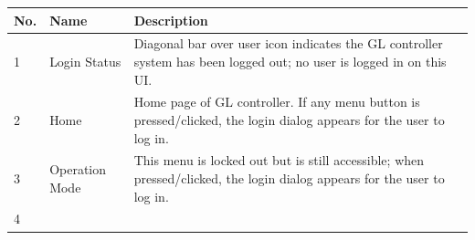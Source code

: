 \begin{longtable}[]{@{}lll@{}}
\toprule
\begin{minipage}[b]{0.10\columnwidth}\raggedright
No.\strut
\end{minipage} & \begin{minipage}[b]{0.14\columnwidth}\raggedright
Name\strut
\end{minipage} & \begin{minipage}[b]{0.67\columnwidth}\raggedright
Description\strut
\end{minipage}\tabularnewline
\midrule
\endhead
\begin{minipage}[t]{0.10\columnwidth}\raggedright
1\strut
\end{minipage} & \begin{minipage}[t]{0.14\columnwidth}\raggedright
Login Status\strut
\end{minipage} & \begin{minipage}[t]{0.67\columnwidth}\raggedright
Diagonal bar over user icon indicates the GL controller system has been
logged out; no user is logged in on this UI.\strut
\end{minipage}\tabularnewline
\begin{minipage}[t]{0.10\columnwidth}\raggedright
2\strut
\end{minipage} & \begin{minipage}[t]{0.14\columnwidth}\raggedright
Home\strut
\end{minipage} & \begin{minipage}[t]{0.67\columnwidth}\raggedright
Home page of GL controller. If any menu button is pressed/clicked, the
login dialog appears for the user to log in.\strut
\end{minipage}\tabularnewline
\begin{minipage}[t]{0.10\columnwidth}\raggedright
3\strut
\end{minipage} & \begin{minipage}[t]{0.14\columnwidth}\raggedright
Operation Mode\strut
\end{minipage} & \begin{minipage}[t]{0.67\columnwidth}\raggedright
This menu is locked out but is still accessible; when pressed/clicked,
the login dialog appears for the user to log in.\strut
\end{minipage}\tabularnewline
\begin{minipage}[t]{0.10\columnwidth}\raggedright
4\strut
\end{minipage} & \begin{minipage}[t]{0.14\columnwidth}\raggedright

\end{minipage}
\end{longtable}

